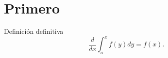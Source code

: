 \chapter{Primero}
\lipsum[1-3]
\begin{defn}[ver ] Definición definitiva $$\frac{d}{dx}\int_a^xf(y)dy=f(x).$$\end{defn}